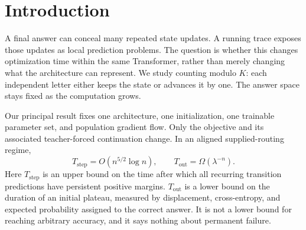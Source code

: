 \begin{abstract}
Can intermediate supervision teach a recurring transition quickly when final-answer supervision supplies exponentially weak credit? We establish a matched separation for modular counting in a concrete two-block causal softmax-attention/ReLU Transformer. Two population gradient flows start from the same aligned, small, structured initialization and train the same readouts and tied query--key scalars. Process supervision develops persistent positive margins on every recurring supervised transition in $O(n^{5/2}\log n)$ time at linear executor width; outcome supervision remains near initialization, with expected correct-answer probability near $1/K$, for $\Omega(\lambda^{-n})$ time. The positive result fixes the value features and supplies routing; the outcome plateau also holds for a broader joint-training family. Separate explicit constructions realize both complete programs in the overall architecture, without asserting their reachability in the restricted trained subspace. Counting measurements and pretrained Qwen2.5-0.5B LoRA experiments support the qualitative mechanism; a five-object BIG-Bench Hard reversal limits its empirical scope.
\end{abstract}

\section{Introduction}
A final answer can conceal many repeated state updates. A running trace exposes those updates as local prediction problems. The question is whether this changes optimization time within the same Transformer, rather than merely changing what the architecture can represent. We study counting modulo $K$: each independent letter either keeps the state or advances it by one. The answer space stays fixed as the computation grows.

Our principal result fixes one architecture, one initialization, one trainable parameter set, and population gradient flow. Only the objective and its associated teacher-forced continuation change. In an aligned supplied-routing regime,
\begin{equation}\label{eq:headline}
\boxed{T_{\mathrm{step}}=O(n^{5/2}\log n),\qquad T_{\mathrm{out}}=\Omega(\lambda^{-n}).}
\end{equation}
Here $T_{\mathrm{step}}$ is an upper bound on the time after which all recurring transition predictions have persistent positive margins. $T_{\mathrm{out}}$ is a lower bound on the duration of an initial plateau, measured by displacement, cross-entropy, and expected probability assigned to the correct answer. It is not a lower bound for reaching arbitrary accuracy, and it says nothing about permanent failure.

